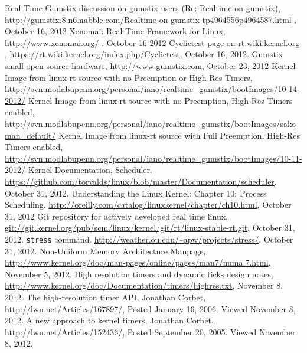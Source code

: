 \begin{thebibliography}{9}
Real Time Gumstix discussion on gumstix-users (Re: Realtime on gumstix), \url{http://gumstix.8.n6.nabble.com/Realtime-on-gumstix-tp4964556p4964587.html} . October 16, 2012
Xenomai: Real-Time Framework for Linux, \url{http://www.xenomai.org/} . October 16 2012
Cyclictest page on rt.wiki.kernel.org , \url{https://rt.wiki.kernel.org/index.php/Cyclictest}, October 16, 2012.
Gumstix small open source hardware, \url{http://www.gumstix.com}, October 23, 2012
Kernel Image from linux-rt source with no Preemption or High-Res Timers, \url{http://svn.modabupenn.org/personal/iano/realtime_gumstix/bootImages/10-14-2012/}
Kernel Image from linux-rt source with no Preemption, High-Res Timers enabled, \url{http://svn.modlabupenn.org/personal/iano/realtime_gumstix/bootImages/sakoman_default/}
Kernel Image from linux-rt source with Full Preemption, High-Res Timers enabled, \url{http://svn.modlabupenn.org/personal/iano/realtime_gumstix/bootImages/10-11-2012/}
Kernel Documentation, Scheduler.  \url{https://github.com/torvalds/linux/blob/master/Documentation/scheduler}. October 31, 2012.
Understanding the Linux Kernel: Chapter 10: Process Scheduling.  \url{http://oreilly.com/catalog/linuxkernel/chapter/ch10.html}, October 31, 2012
Git repository for actively developed real time linux, \url{git://git.kernel.org/pub/scm/linux/kernel/git/rt/linux-stable-rt.git}, October 31, 2012.
\texttt{stress} command. \url{http://weather.ou.edu/~apw/projects/stress/}. October 31, 2012.
Non-Uniform Memory Architecture Manpage, \url{http://www.kernel.org/doc/man-pages/online/pages/man7/numa.7.html}, November 5, 2012.
High resolution timers and dynamic ticks design notes, \url{http://www.kernel.org/doc/Documentation/timers/highres.txt}, November 8, 2012.
The high-resolution timer API, Jonathan Corbet, \url{http://lwn.net/Articles/167897/}, Posted January 16, 2006.  Viewed November 8, 2012.
A new approach to kernel timers, Jonathan Corbet, \url{http://lwn.net/Articles/152436/}, Posted September 20, 2005.  Viewed November 8, 2012.
\end{thebibliography}


